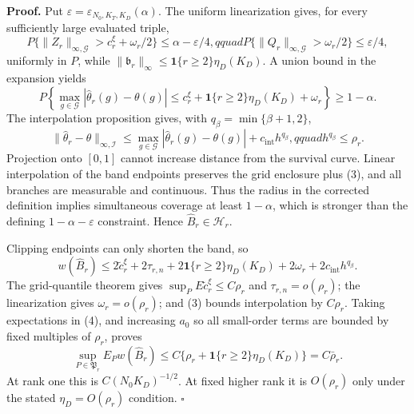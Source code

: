 \textbf{Proof.}
Put \(\varepsilon=\varepsilon_{N_0,K_T,K_D}(\alpha)\). The uniform linearization gives, for every sufficiently large evaluated triple,
\[
 P\{\|Z_r\|_{\infty,\mathcal G}>c_r^\xi+\omega_r/2\}
 \le\alpha-\varepsilon/4,qquad
 P\{\|Q_r\|_{\infty,\mathcal G}>\omega_r/2\}\le\varepsilon/4, \tag{1}
\]
uniformly in \(P\), while \(\|\mathfrak b_r\|_\infty\le\mathbf1\{r\ge2\}\eta_D(K_D)\). A union bound in the expansion yields
\[
 P\left\{\max_{g\in\mathcal G}|\widehat\theta_r(g)-\theta(g)|
 \le c_r^\xi+\mathbf1\{r\ge2\}\eta_D(K_D)+\omega_r\right\}
 \ge1-\alpha.                                             \tag{2}
\]
The interpolation proposition gives, with \(q_\beta=\min\{\beta+1,2\}\),
\[
 \|\widehat\theta_r-\theta\|_{\infty,\mathcal I}
 \le\max_{g\in\mathcal G}|\widehat\theta_r(g)-\theta(g)|
 +c_{\mathrm{int}}h^{q_\beta},qquad h^{q_\beta}\le\rho_r. \tag{3}
\]
Projection onto \([0,1]\) cannot increase distance from the survival curve. Linear interpolation of the band endpoints preserves the grid enclosure plus (3), and all branches are measurable and continuous. Thus the radius in the corrected definition implies simultaneous coverage at least \(1-\alpha\), which is stronger than the defining \(1-\alpha-\varepsilon\) constraint. Hence \(\widehat B_r\in\mathcal H_r\).

Clipping endpoints can only shorten the band, so
\[
 w(\widehat B_r)\le2\widetilde c_r^\xi+2\tau_{r,n}
 +2\mathbf1\{r\ge2\}\eta_D(K_D)+2\omega_r
 +2c_{\mathrm{int}}h^{q_\beta}.                           \tag{4}
\]
The grid-quantile theorem gives \(\sup_PE\widetilde c_r^\xi\le C\rho_r\) and \(\tau_{r,n}=o(\rho_r)\); the linearization gives \(\omega_r=o(\rho_r)\); and (3) bounds interpolation by \(C\rho_r\). Taking expectations in (4), and increasing \(a_0\) so all small-order terms are bounded by fixed multiples of \(\rho_r\), proves
\[
 \sup_{P\in\mathfrak P_r}E_Pw(\widehat B_r)
 \le C\{\rho_r+\mathbf1\{r\ge2\}\eta_D(K_D)\}=C\bar\rho_r. \tag{5}
\]
At rank one this is \(C(N_0K_D)^{-1/2}\). At fixed higher rank it is \(O(\rho_r)\) only under the stated \(\eta_D=O(\rho_r)\) condition. \(\square\)